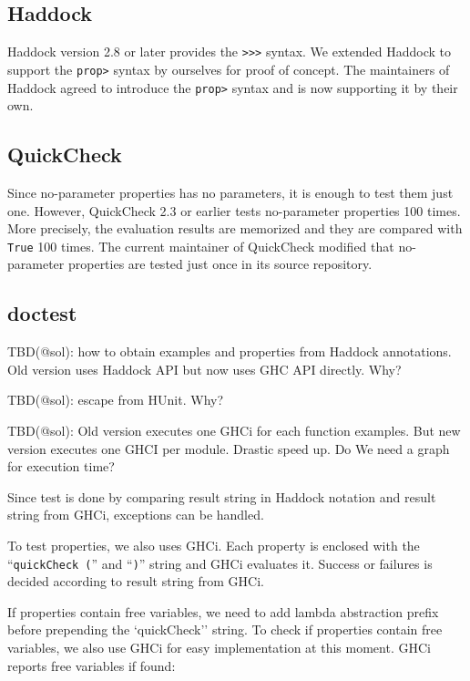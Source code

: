 \documentclass[preprint]{sigplanconf}
\begin{document}
\subsection{Haddock}

Haddock version 2.8 or later provides the {\tt >>>} syntax.
We extended Haddock to support the {\tt prop>} syntax by ourselves
for proof of concept.
The maintainers of Haddock agreed to introduce
the {\tt prop>} syntax and is now supporting it by their own.

\subsection{QuickCheck}

Since no-parameter properties has no parameters,
it is enough to test them just one.
However, QuickCheck 2.3 or earlier tests no-parameter properties 100 times.
More precisely, the evaluation results are memorized and they are
compared with {\tt True} 100 times.
The current maintainer of QuickCheck modified that
no-parameter properties are tested just once in its source repository.

\subsection{doctest}
\label{sec:doctest}

TBD(@sol): how to obtain examples and properties from Haddock annotations.
Old version uses Haddock API but now uses GHC API directly. Why?

TBD(@sol): escape from HUnit. Why?

TBD(@sol): Old version executes one GHCi for each function examples.
But new version executes one GHCI per module.
Drastic speed up. Do We need a graph for execution time?

Since test is done by comparing result string in Haddock notation
and result string from GHCi, exceptions can be handled.

To test properties, we also uses GHCi.
Each property is enclosed with
the ``\verb|quickCheck (|'' and ``\verb|)|'' string
and GHCi evaluates it.
Success or failures is decided according to result string from GHCi.

If properties contain free variables,
we need to add lambda abstraction prefix before prepending
the `quickCheck'' string.
To check if properties contain free variables,
we also use GHCi for easy implementation at this moment.
GHCi reports free variables if found:
\end{document}
